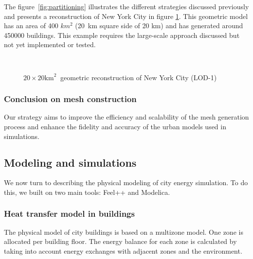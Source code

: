\documentclass[runningheads]{llncs}
\begin{document}
The figure~\ref{fig:partitioning} illustrates the different strategies discussed previously and presents a reconstruction of New York City in figure \ref{fig:city-ny-largescale}. This geometric model has an area of 400 $km^2$ (20 km square side of 20 km) and has generated around 450000 buildings. This example requires the large-scale approach discussed but not yet implemented or tested. 

\begin{figure}[htbp]
\centering
{}
\hfill
{}\\
\hfill
{}
\caption{$20 \times 20 \mathrm{km}^2\ $ geometric reconstruction of New York City (LOD-1)}
\label{fig:city-ny-largescale}
\end{figure}


\subsubsection{Conclusion on mesh construction}

Our strategy aims to improve the efficiency and scalability of the mesh generation process and enhance the fidelity and accuracy of the urban models used in simulations.

\subsection{Modeling and simulations}

We now turn to describing the physical modeling of city energy simulation.
To do this, we built on two main tools: Feel++ and Modelica.

\subsubsection{Heat transfer model in buildings}
\label{sec:heat-transfer-in-buildings}

The physical model of city buildings is based on a multizone model.
One zone is allocated per building floor. 
The energy balance for each zone is calculated by taking into account energy exchanges with adjacent zones and the environment.
\end{document}
